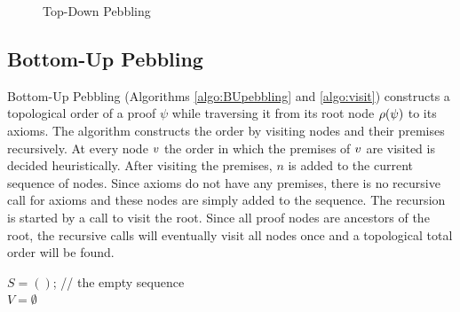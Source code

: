 \documentclass{llncs}
\newcommand{\nodedistance}{0.6cm}
\begin{document}
\begin{example}
\begin{figure}[h]
{\begin{minipage}{.4\textwidth}
	\end{minipage}%
	}
	\caption{Top-Down Pebbling}
	\label{fig:TDP}
\end{figure}
\label{example:TDPIssue}
\end{example}


\subsection{Bottom-Up Pebbling}

Bottom-Up Pebbling (Algorithms \ref{algo:BUpebbling} and \ref{algo:visit}) constructs a topological order of a proof $\psi$ while traversing it from its root node $\rho(\psi)$ to its axioms. The algorithm constructs the order by visiting nodes and their premises recursively. At every node $v$ the order in which the premises of $v$ are visited is decided heuristically. After visiting the premises, $n$ is added to the current sequence of nodes.
Since axioms do not have any premises, there is no recursive call for axioms and these nodes are simply added to the sequence. The recursion is started by a call to visit the root.
Since all proof nodes are ancestors of the root, the recursive calls will eventually visit all nodes once and a topological total order will be found.



\begin{algorithm}[h]
  \BlankLine

	$S = ()$; // the empty sequence \\
	$V = \emptyset$\;
	\Return {}\;

  \caption[.]{}
  \label{algo:BUpebbling}
\end{algorithm}
\end{document}
